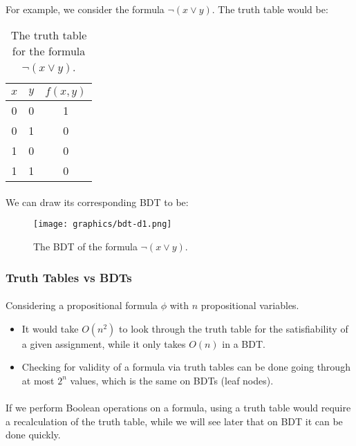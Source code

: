 \documentclass{article}
\theoremstyle{plain}
\theoremstyle{definition}
\begin{document}
\begin{multicols}{2}
\paragraph{} For example, we consider the formula $\lnot(x \lor y)$. The truth table would be:

\begin{table}[H]
\centering
\begin{tabular}{| c | c | c |}
\hline
$x$ & $y$ & $f(x, y)$ \\
\hline
\hline
0 & 0 & 1 \\
\hline
0 & 1 & 0 \\
\hline
1 & 0 & 0 \\
\hline
1 & 1 & 0 \\
\hline
\end{tabular}
\caption{The truth table for the formula $\lnot(x \lor y)$.}
\end{table}

\paragraph{} We can draw its corresponding BDT to be:

\begin{figure}[H]
\centering
\texttt{[image: graphics/bdt-d1.png]}
\caption{The BDT of the formula $\lnot(x \lor y)$.}\label{fig:BDTD1}
\end{figure}

\subsubsection{Truth Tables vs BDTs}\label{sec:TruthTablesvsBDTs}

\paragraph{} Considering a propositional formula $\phi$ with $n$ propositional variables. 

\begin{itemize}
\item It would take $O(n^2)$ to look through the truth table for the satisfiability of a given assignment, while it only takes $O(n)$ in a BDT.
\item Checking for validity of a formula via truth tables can be done going through at most $2^n$ values, which is the same on BDTs (leaf nodes).
\end{itemize}

\paragraph{} If we perform Boolean operations on a formula, using a truth table would require a recalculation of the truth table, while we will see later that on BDT it can be done quickly. 


\end{multicols}
\end{document}
